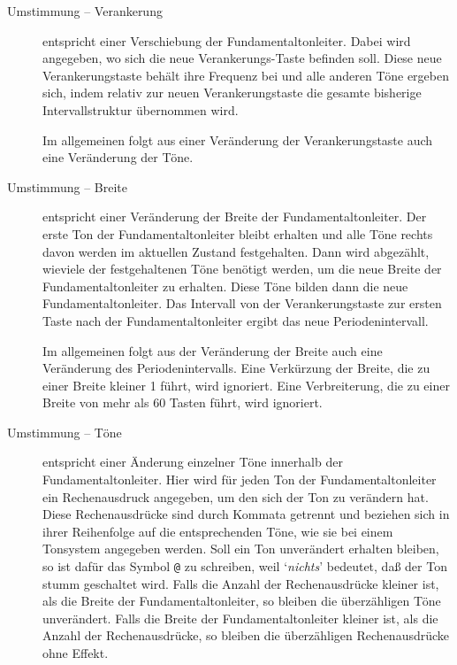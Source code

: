 \begin{description}
  \item[Umstimmung – Verankerung]
      entspricht einer Verschiebung
      der Fundamentaltonleiter. Dabei wird angegeben, wo sich die
      neue Verankerungs-Taste befinden soll. Diese neue Verankerungstaste
      behält ihre Frequenz bei und alle anderen Töne ergeben sich,
      indem relativ zur neuen Verankerungstaste die gesamte
      bisherige Intervallstruktur
      übernommen wird.

      Im allgemeinen folgt aus einer Veränderung der Verankerungstaste auch
      eine Veränderung der Töne.

      

      

  \item[Umstimmung – Breite]
      entspricht einer Veränderung der Breite
      der Fundamentaltonleiter.
      Der erste Ton der Fundamentaltonleiter bleibt erhalten und alle
      Töne rechts davon werden im aktuellen Zustand festgehalten.
      Dann wird abgezählt, wieviele der festgehaltenen Töne benötigt
      werden, um die neue Breite der Fundamentaltonleiter zu erhalten.
      Diese Töne bilden dann die neue Fundamentaltonleiter.
      Das Intervall von der Verankerungstaste zur ersten Taste nach der
      Fundamentaltonleiter ergibt das neue Periodenintervall.

      Im allgemeinen folgt aus der Veränderung der Breite auch eine Veränderung
      des Periodenintervalls. Eine Verkürzung der Breite, die zu einer
      Breite kleiner 1 führt, wird ignoriert. Eine Verbreiterung, die
      zu einer Breite von mehr als 60 Tasten führt, wird ignoriert.

      


  \item[Umstimmung – Töne]
      entspricht einer Änderung einzelner Töne
      innerhalb der Fundamentaltonleiter.
      Hier wird für jeden Ton der Fundamentaltonleiter ein Rechenausdruck
      angegeben, um den sich der Ton zu verändern hat. Diese Rechenausdrücke
      sind durch Kommata getrennt und beziehen sich in ihrer Reihenfolge
      auf die entsprechenden Töne, wie sie bei einem Tonsystem
      angegeben werden.
      Soll ein Ton unverändert
      erhalten bleiben, so ist dafür das Symbol \texttt{@}
      zu schreiben, weil
      `\emph{nichts}' bedeutet, daß der Ton stumm geschaltet wird.
      Falls die Anzahl der Rechenausdrücke kleiner ist, als die
      Breite der Fundamentaltonleiter, so bleiben die überzähligen Töne
      unverändert. Falls die Breite der Fundamentaltonleiter kleiner ist,
      als die Anzahl der Rechenausdrücke, so bleiben die
      überzähligen Rechenausdrücke ohne Effekt.


\end{description}
